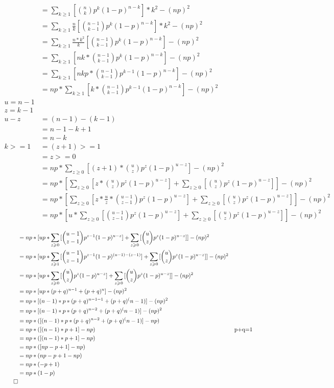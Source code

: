 \documentclass[]{book}
\begin{document}
\begin{align}
&= \sum_{k \geqslant 1} {[\binom{n} {k} p^k (1-p)^{n-k}]*k^2} - (np)^2\\
&= \sum_{k \geqslant 1} {\frac{n}{k} [\binom{n-1} {k-1} p^k (1-p)^{n-k}]*k^2} - (np)^2\\
&= \sum_{k \geqslant 1} {\frac{n*k^2}{k} [\binom{n-1} {k-1} p^k (1-p)^{n-k}]} - (np)^2\\
&= \sum_{k \geqslant 1} {[nk*\binom{n-1} {k-1} p^k (1-p)^{n-k}]} - (np)^2\\
&= \sum_{k \geqslant 1} {[nkp*\binom{n-1} {k-1} p^{k-1} (1-p)^{n-k}]} - (np)^2\\
&= np*\sum_{k \geqslant 1} {[k*\binom{n-1} {k-1} p^{k-1} (1-p)^{n-k}]} - (np)^2\\
u = n-1\\
z = k-1\\
u-z&=(n-1)-(k-1)\\
&=n-1-k+1\\
&=n-k\\
k >= 1 &= (z+1) >=1\\
&= z >= 0\\
&= np*\sum_{z \geqslant 0} {[(z+1)* \binom{u} {z} p^{z} (1-p)^{u-z}]} - (np)^2\\
&= np*[\sum_{z \geqslant 0} {[z*\binom{u} {z} p^{z} (1-p)^{u-z}]} + \sum_{z \geqslant 0} {[\binom{u} {z} p^{z} (1-p)^{u-z}]}] - (np)^2\\
&= np*[\sum_{z \geqslant 0} {[z*\frac{u}{z}*\binom{u-1} {z-1} p^{z} (1-p)^{u-z}]} + \sum_{z \geqslant 0} {[\binom{u} {z} p^{z} (1-p)^{u-z}]}] - (np)^2\\
&= np*[u*\sum_{z \geqslant 0} {[\binom{u-1} {z-1} p^{z} (1-p)^{u-z}]} + \sum_{z \geqslant 0} {[\binom{u} {z} p^{z} (1-p)^{u-z}]}] - (np)^2\\
\end{align}
\begin{align}
&= np*[up*\sum_{z \geqslant 0} {[\binom{u-1} {z-1} p^{z-1} (1-p)^{u-z}]} + \sum_{z \geqslant 0} {[\binom{u} {z} p^{z} (1-p)^{u-z}]}] - (np)^2\\
&= np*[up*\sum_{z \geqslant 1} {[\binom{u-1} {z-1} p^{z-1} (1-p)^{(u-1)-(z-1)}]} + \sum_{z \geqslant 0} {[\binom{u} {z} p^{z} (1-p)^{u-z}]}] - (np)^2\\
&= np*[up*\sum_{z \geqslant 0} {[\binom{u} {z} p^{z} (1-p)^{u-z}]} + \sum_{z \geqslant 0} {[\binom{u} {z} p^{z} (1-p)^{u-z}]}] - (np)^2\\
&= np*[up*(p+q)^{u-1} + (p+q)^u] - (np)^2\\
&= np*[(n-1)*p*(p+q)^{n-1-1}+(p+q)^(n-1)] -(np)^2\\
&= np*[(n-1)*p*(p+q)^{n-2}+(p+q)^(n-1)] - (np)^2\\
&= np*([(n-1)*p*(p+q)^{n-2}+(p+q)^(n-1)] - np)\\
&= np*([(n-1)*p+1] - np) && \text{p+q=1}\\
&= np*([(n-1)*p+1] - np)\\
&= np*([np-p +1] - np)\\
&= np*(np-p +1- np)\\
&= np*(-p +1)\\
&= np*(1-p)\\
\qed
\end{align}
 
\end{document}
